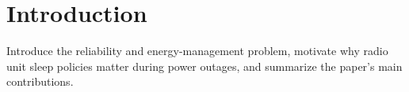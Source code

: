 \section{Introduction}

Introduce the reliability and energy-management problem, motivate why radio
unit sleep policies matter during power outages, and summarize the paper's
main contributions.
